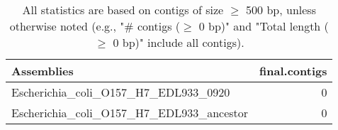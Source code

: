 \documentclass[12pt,a4paper]{article}
\begin{document}
\begin{table}[ht]
\begin{center}
\caption{All statistics are based on contigs of size $\geq$ 500 bp, unless otherwise noted (e.g., "\# contigs ($\geq$ 0 bp)" and "Total length ($\geq$ 0 bp)" include all contigs).}
\begin{tabular}{|l*{1}{|r}|}
\hline
Assemblies & final.contigs \\ \hline
Escherichia\_coli\_O157\_H7\_EDL933\_0920 & 0 \\ \hline
Escherichia\_coli\_O157\_H7\_EDL933\_ancestor & 0 \\ \hline
\end{tabular}
\end{center}
\end{table}
\end{document}
